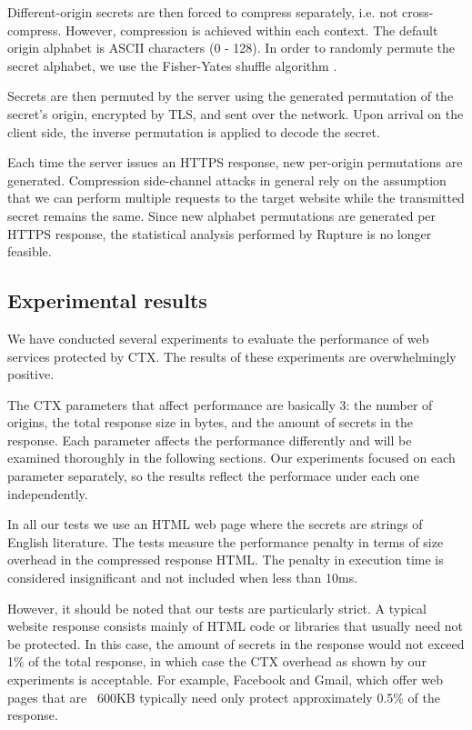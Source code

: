 Different-origin secrets are then forced to compress separately, i.e. not
cross-compress. However, compression is achieved within each context. The
default origin alphabet is ASCII characters (0 - 128). In order to randomly
permute the secret alphabet, we use the Fisher-Yates shuffle
algorithm \cite{fisher1938statistical}.

Secrets are then permuted by the server using the generated permutation of the
secret's origin, encrypted by TLS, and sent over the network. Upon arrival on
the client side, the inverse permutation is applied to decode the secret.

Each time the server issues an HTTPS response, new per-origin permutations are
generated. Compression side-channel attacks in general rely on the assumption
that we can perform multiple requests to the target website while the
transmitted secret remains the same. Since new alphabet permutations are
generated per HTTPS response, the statistical analysis performed by Rupture is
no longer feasible.

\subsection{Experimental results}\label{subsec:ctx_experiments}

We have conducted several experiments to evaluate the performance of web
services protected by CTX. The results of these experiments are overwhelmingly
positive.

The CTX parameters that affect performance are basically 3: the number of
origins, the total response size in bytes, and the amount of
secrets in the response. Each parameter affects the performance differently and
will be examined thoroughly in the following sections. Our experiments focused
on each parameter separately, so the results reflect the performace under each
one independently.

In all our tests we use an HTML web page where the secrets are strings of
English literature. The tests measure the performance penalty in terms of size
overhead in the compressed response HTML. The penalty in execution time is
considered insignificant and not included when less than 10ms.

However, it should be noted that our tests are particularly strict. A typical
website response consists mainly of HTML code or libraries that usually need not
be protected. In this case, the amount of secrets in the response would not
exceed 1\% of the total response, in which case the CTX overhead as shown by our
experiments is acceptable. For example, Facebook and Gmail, which offer web
pages that are ~600KB typically need only protect approximately 0.5\% of the
response.

